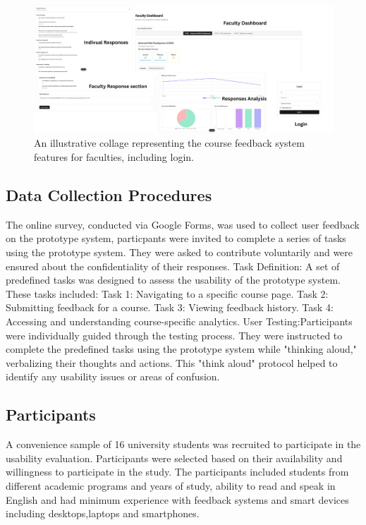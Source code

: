 \documentclass[conference]{IEEEtran}
\begin{document}
\begin{figure}[!h]
    \centering
    \includegraphics[width=\textwidth]{faculty.png}
    \caption{An illustrative collage representing the course feedback system features for faculties, including login.}
    \label{fig:faculty_features}
\end{figure}



\subsection{Data Collection Procedures}
The online survey, conducted via Google Forms, was used to collect user feedback on the prototype system, particpants were invited to complete a series of tasks using the prototype system. They were asked to contribute voluntarily and were ensured about the confidentiality of their responses.
Task Definition: A set of predefined tasks was designed to assess the usability of the prototype system. These tasks included:
     Task 1: Navigating to a specific course page.
    Task 2: Submitting feedback for a course.
     Task 3: Viewing feedback history.
     Task 4: Accessing and understanding course-specific analytics. 
User Testing:Participants were individually guided through the testing process. They were instructed to complete the predefined tasks using the prototype system while "thinking aloud," verbalizing their thoughts and actions. This "think aloud" protocol helped to identify any usability issues or areas of confusion.


\subsection{Participants}
A convenience sample of 16 university students was recruited to participate in the usability evaluation. Participants were selected based on their availability and willingness to participate in the study. The participants included students from different academic programs and years of study, ability to read and speak in English and had minimum experience with feedback systems and smart devices including desktops,laptops and smartphones.
\end{document}
